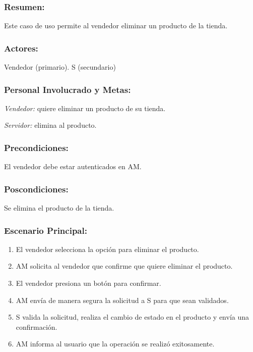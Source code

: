 \begin{framed}


\subsubsection{Resumen:} Este caso de uso permite al vendedor eliminar un producto de la tienda.


\subsubsection{Actores:} Vendedor (primario). S (secundario)

\subsubsection{Personal Involucrado y Metas:}

\emph{Vendedor:} quiere eliminar un producto de su tienda.

\emph{Servidor:} elimina al producto.

\subsubsection{Precondiciones:} 
El vendedor debe estar autenticados en AM. 

\subsubsection{Poscondiciones:} 
Se elimina el producto de la tienda.

\subsubsection{Escenario Principal: }

\begin{enumerate}
    \item El vendedor selecciona la opción para eliminar el producto. 
    \item AM solicita al vendedor que confirme que quiere eliminar el producto.
    \item El vendedor presiona un botón para confirmar.
    \item AM envía de manera segura la solicitud a S para que sean validados.
    \item S valida la solicitud, realiza el cambio de estado en el producto y envía una confirmación.
    \item AM informa al usuario que la operación se realizó exitosamente.
\end{enumerate}


\end{framed}
